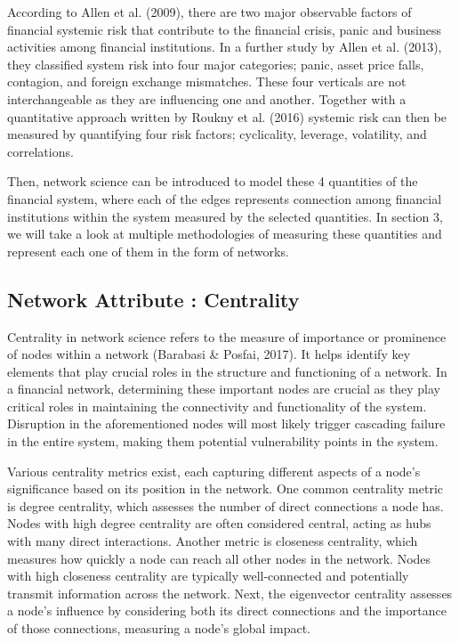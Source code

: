 \documentclass[a4paper,11pt]{article}
\begin{document}
According to Allen et al. (2009), there are two major observable factors of financial systemic risk that contribute to the financial crisis, panic and business activities among financial institutions. In a further study by Allen et al. (2013), they classified system risk into four major categories; panic, asset price falls, contagion, and foreign exchange mismatches. These four verticals are not interchangeable as they are influencing one and another. Together with a quantitative approach written by Roukny et al. (2016) systemic risk can then be measured by quantifying four risk factors; cyclicality, leverage, volatility, and correlations.

Then, network science can be introduced to model these 4 quantities of the financial system, where each of the edges represents connection among financial institutions within the system measured by the selected quantities. In section 3, we will take a look at multiple methodologies of measuring these quantities and represent each one of them in the form of networks.

\subsection{Network Attribute : Centrality}
Centrality in network science refers to the measure of importance or prominence of nodes within a network (Barabasi \& Posfai, 2017). It helps identify key elements that play crucial roles in the structure and functioning of a network. In a financial network, determining these important nodes are crucial as they play critical roles in maintaining the connectivity and functionality of the system. Disruption in the aforementioned nodes will most likely trigger cascading failure in the entire system, making them potential vulnerability points in the system.

Various centrality metrics exist, each capturing different aspects of a node’s significance based on its position in the network. One common centrality metric is degree centrality, which assesses the number of direct connections a node has. Nodes with high degree centrality are often considered central, acting as hubs with many direct interactions. Another metric is closeness centrality, which measures how quickly a node can reach all other nodes in the network. Nodes with high closeness centrality are typically well-connected and potentially transmit information across the network. Next, the eigenvector centrality assesses a node’s influence by considering both its direct connections and the importance of those connections, measuring a node’s global impact.
\end{document}
